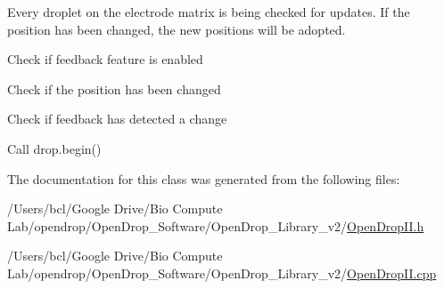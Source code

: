 Every droplet on the electrode matrix is being checked for updates. If the position has been changed, the new positions will be adopted.
\begin{DoxyEnumerate}
\item Check if feedback feature is enabled~\newline

\item Check if the position has been changed~\newline

\item Check if feedback has detected a change~\newline

\item Call drop.\+begin() 
\end{DoxyEnumerate}

The documentation for this class was generated from the following files\+:\begin{DoxyCompactItemize}
\item 
/\+Users/bcl/\+Google Drive/\+Bio Compute Lab/opendrop/\+Open\+Drop\+\_\+\+Software/\+Open\+Drop\+\_\+\+Library\+\_\+v2/\mbox{\hyperlink{_open_drop_i_i_8h}{Open\+Drop\+I\+I.\+h}}\item 
/\+Users/bcl/\+Google Drive/\+Bio Compute Lab/opendrop/\+Open\+Drop\+\_\+\+Software/\+Open\+Drop\+\_\+\+Library\+\_\+v2/\mbox{\hyperlink{_open_drop_i_i_8cpp}{Open\+Drop\+I\+I.\+cpp}}\end{DoxyCompactItemize}
